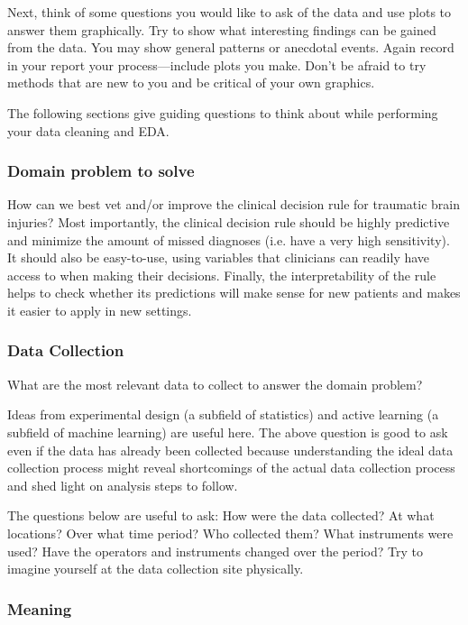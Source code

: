 \documentclass[10pt,letterpaper]{article}
\begin{document}
Next, think of some questions you would like to ask of the data and use plots to answer them graphically. Try to show what interesting findings can be gained from the data. You may show general patterns or anecdotal events. Again record in your report your process---include plots you make. Don’t be afraid to try methods that are new to you and be critical of your own graphics.

The following sections give guiding questions to think about while performing your data cleaning and EDA.

\subsubsection*{Domain problem to solve}

How can we best vet and/or improve the clinical decision rule for traumatic brain injuries? Most importantly, the clinical decision rule should be highly predictive and minimize the amount of missed diagnoses (i.e. have a very high sensitivity). It should also be easy-to-use, using variables that clinicians can readily have access to when making their decisions. Finally, the interpretability of the rule helps to check whether its predictions will make sense for new patients and makes it easier to apply in new settings.

\subsubsection*{Data Collection}

What are the most relevant data to collect to answer the domain problem?

Ideas from experimental design (a subfield of statistics) and active learning (a subfield of machine learning) are useful here. The above question is good to ask even if the data has already been collected because understanding the ideal data collection process might reveal shortcomings of the actual data collection process and shed light on analysis steps to follow.

The questions below are useful to ask: How were the data collected? At what locations? Over what time period? Who collected them? What instruments were used? Have the operators and instruments changed over the period? Try to imagine yourself at the data collection site physically.

\subsubsection*{Meaning}
\end{document}
